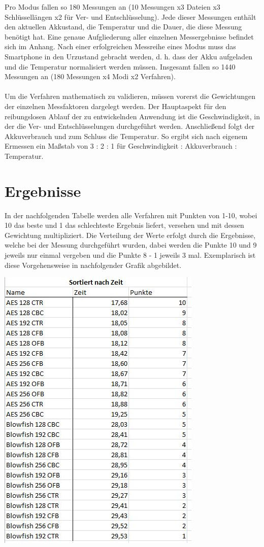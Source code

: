 \documentclass[10pt, a4paper,headsepline]{scrreprt}
\begin{document}
Pro Modus fallen so 180 Messungen an (10 Messungen x3 Dateien x3 Schlüssellängen x2 für Ver- und Entschlüsselung). Jede dieser Messungen enthält den aktuellen Akkustand, die Temperatur und die Dauer, die diese Messung benötigt hat. Eine genaue Aufgliederung aller einzelnen Messergebnisse befindet sich im Anhang. Nach einer erfolgreichen Messreihe eines Modus muss das Smartphone in den Urzustand gebracht werden, d. h. dass der Akku aufgeladen und die Temperatur normalisiert werden müssen. Insgesamt fallen so 1440 Messungen an (180 Messungen x4 Modi x2 Verfahren).\\ \\
Um die Verfahren mathematisch zu validieren, müssen vorerst die Gewichtungen der einzelnen Messfaktoren dargelegt werden. Der Hauptaspekt für den reibungslosen Ablauf der zu entwickelnden Anwendung ist die Geschwindigkeit, in der die Ver- und Entschlüsselungen durchgeführt werden. Anschließend folgt der Akkuverbrauch und zum Schluss die Temperatur. So ergibt sich nach eigenem Ermessen ein Maßstab von 3 : 2 : 1 für Geschwindigkeit : Akkuverbrauch : Temperatur. 


\section{Ergebnisse}
In der nachfolgenden Tabelle werden alle Verfahren mit Punkten von 1-10, wobei 10 das beste und 1 das schlechteste Ergebnis liefert, versehen und mit dessen Gewichtung multipliziert. Die Verteilung der Werte erfolgt durch die Ergebnisse, welche bei der Messung durchgeführt wurden, dabei werden die Punkte 10 und 9 jeweils nur einmal vergeben und die Punkte 8 - 1 jeweils 3 mal. Exemplarisch ist diese Vorgehensweise in nachfolgender Grafik abgebildet. 

\includegraphics[scale=0.9]{tabelle_zeitvergleich_punkte.JPG}
\hfill
\end{document}
